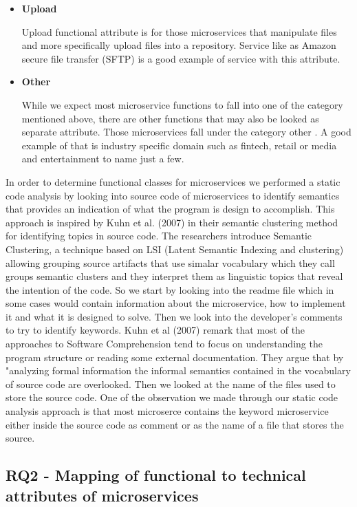 \documentclass{article}
\begin{document}
\begin{itemize}
\item \textbf{Upload}

Upload functional attribute is for those microservices that manipulate files and more specifically upload files into a repository. Service like as Amazon secure file transfer (SFTP) is a good example of service with this attribute.

\item \textbf{Other}

While we expect most microservice functions to fall into one of the category mentioned above, there are other functions that may also be looked as separate attribute. Those microservices fall under the category other . A good example of that is industry specific domain such as fintech, retail or media and entertainment to name just a few.

\end{itemize}
In order to determine functional classes for microservices we performed a static code analysis by looking into source code of microservices to identify semantics that provides an indication of what the program is design to accomplish. This approach is inspired by Kuhn et al. (2007) in their semantic clustering method for identifying topics in source code. The researchers introduce Semantic Clustering, a technique based on LSI (Latent Semantic Indexing and clustering) allowing grouping source artifacts that use simalar vocabulary which they call groups semantic clusters and they interpret them as linguistic topics that reveal the intention of the code. So we start by looking into the readme file which in some cases would contain information about the microservice, how to implement it and what it is designed to solve. Then we look into the developer's comments to try to identify keywords. Kuhn et al (2007) remark that most of the approaches to Software Comprehension tend to focus on understanding the program structure or reading some external documentation. They argue that by "analyzing formal information the informal semantics contained in the vocabulary of source code are overlooked. Then we looked at the name of the files used to store the source code. One of the observation we made through our static code analysis approach is that most microserce contains the keyword microservice either inside the source code as comment or as the name of a file that stores the source.

\subsection{RQ2 - Mapping of functional to technical attributes of microservices}
\end{document}
